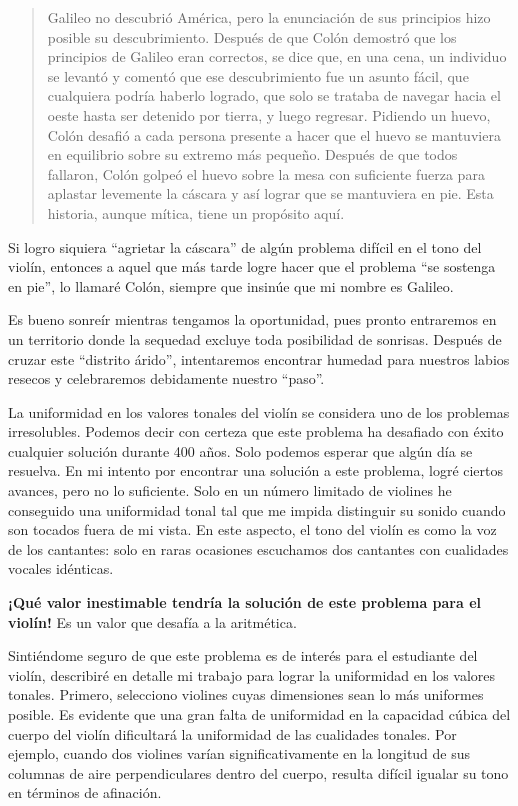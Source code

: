 \documentclass[12pt]{book}
\begin{document}
\begin{quote}
Galileo no descubrió América, pero la enunciación de sus principios hizo posible su descubrimiento. Después de que Colón demostró que los principios de Galileo eran correctos, se dice que, en una cena, un individuo se levantó y comentó que ese descubrimiento fue un asunto fácil, que cualquiera podría haberlo logrado, que solo se trataba de navegar hacia el oeste hasta ser detenido por tierra, y luego regresar. Pidiendo un huevo, Colón desafió a cada persona presente a hacer que el huevo se mantuviera en equilibrio sobre su extremo más pequeño. Después de que todos fallaron, Colón golpeó el huevo sobre la mesa con suficiente fuerza para aplastar levemente la cáscara y así lograr que se mantuviera en pie. Esta historia, aunque mítica, tiene un propósito aquí.  
\end{quote}

Si logro siquiera ``agrietar la cáscara'' de algún problema difícil en el tono del violín, entonces a aquel que más tarde logre hacer que el problema ``se sostenga en pie'', lo llamaré Colón, siempre que insinúe que mi nombre es Galileo.

Es bueno sonreír mientras tengamos la oportunidad, pues pronto entraremos en un territorio donde la sequedad excluye toda posibilidad de sonrisas. Después de cruzar este ``distrito árido'', intentaremos encontrar humedad para nuestros labios resecos y celebraremos debidamente nuestro ``paso''.

La uniformidad en los valores tonales del violín se considera uno de los problemas irresolubles. Podemos decir con certeza que este problema ha desafiado con éxito cualquier solución durante 400 años. Solo podemos esperar que algún día se resuelva. En mi intento por encontrar una solución a este problema, logré ciertos avances, pero no lo suficiente. Solo en un número limitado de violines he conseguido una uniformidad tonal tal que me impida distinguir su sonido cuando son tocados fuera de mi vista. En este aspecto, el tono del violín es como la voz de los cantantes: solo en raras ocasiones escuchamos dos cantantes con cualidades vocales idénticas.

\textbf{¡Qué valor inestimable tendría la solución de este problema para el violín!}  
Es un valor que desafía a la aritmética.

Sintiéndome seguro de que este problema es de interés para el estudiante del violín, describiré en detalle mi trabajo para lograr la uniformidad en los valores tonales. Primero, selecciono violines cuyas dimensiones sean lo más uniformes posible. Es evidente que una gran falta de uniformidad en la capacidad cúbica del cuerpo del violín dificultará la uniformidad de las cualidades tonales. Por ejemplo, cuando dos violines varían significativamente en la longitud de sus columnas de aire perpendiculares dentro del cuerpo, resulta difícil igualar su tono en términos de afinación.
\end{document}
